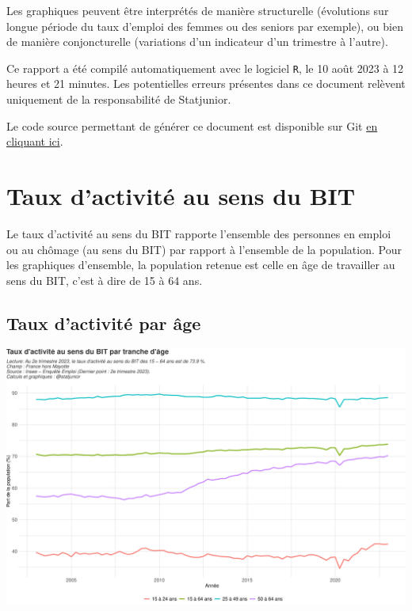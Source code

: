 \documentclass[
  paper=a4,
  ,captions=tableheading
]{scrartcl}
\begin{document}
Les graphiques peuvent être interprétés de manière structurelle
(évolutions sur longue période du taux d'emploi des femmes ou des
seniors par exemple), ou bien de manière conjoncturelle (variations d'un
indicateur d'un trimestre à l'autre).

Ce rapport a été compilé automatiquement avec le logiciel \texttt{R}, le
10 août 2023 à 12 heures et 21 minutes. Les potentielles erreurs
présentes dans ce document relèvent uniquement de la responsabilité de
Statjunior.

Le code source permettant de générer ce document est disponible sur Git
\href{https://github.com/statjunior/Statjunior/tree/main/March\%C3\%A9\%20du\%20travail\%20et\%20ch\%C3\%B4mage/Emploi\%20et\%20activit\%C3\%A9\%20-\%20Enqu\%C3\%AAte\%20Emploi/}{en
cliquant ici}.

\newpage

\hypertarget{taux-dactivituxe9-au-sens-du-bit}{%
\section{Taux d'activité au sens du
BIT}\label{taux-dactivituxe9-au-sens-du-bit}}

Le taux d'activité au sens du BIT rapporte l'ensemble des personnes en
emploi ou au chômage (au sens du BIT) par rapport à l'ensemble de la
population. Pour les graphiques d'ensemble, la population retenue est
celle en âge de travailler au sens du BIT, c'est à dire de 15 à 64 ans.

\hypertarget{taux-dactivituxe9-par-uxe2ge}{%
\subsection{Taux d'activité par
âge}\label{taux-dactivituxe9-par-uxe2ge}}

\includegraphics{rapport_activite_emploi_chomage_insee_files/figure-latex/unnamed-chunk-2-1.pdf}
\end{document}
